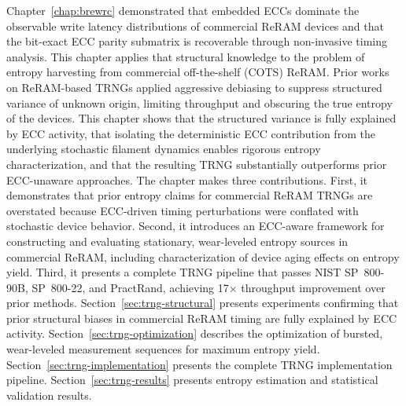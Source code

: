 \label{chap:trng}

Chapter~\ref{chap:brewrc} demonstrated that embedded ECCs dominate the
observable write latency distributions of commercial ReRAM devices and
that the bit-exact ECC parity submatrix is recoverable through
non-invasive timing analysis. This chapter applies that structural
knowledge to the problem of entropy harvesting from commercial
off-the-shelf (COTS) ReRAM. Prior works on ReRAM-based TRNGs applied
aggressive debiasing to suppress structured variance of unknown origin,
limiting throughput and obscuring the true entropy of the devices. This
chapter shows that the structured variance is fully explained by ECC
activity, that isolating the deterministic ECC contribution from the
underlying stochastic filament dynamics enables rigorous entropy
characterization, and that the resulting TRNG substantially outperforms
prior ECC-unaware approaches. The chapter makes three contributions.
First, it demonstrates that prior entropy claims for commercial ReRAM
TRNGs are overstated because ECC-driven timing perturbations were
conflated with stochastic device behavior. Second, it introduces an
ECC-aware framework for constructing and evaluating stationary,
wear-leveled entropy sources in commercial ReRAM, including
characterization of device aging effects on entropy yield. Third, it
presents a complete TRNG pipeline that passes NIST SP~800-90B,
SP~800-22, and PractRand, achieving 17$\times$ throughput improvement
over prior methods. Section~\ref{sec:trng-structural} presents
experiments confirming that prior structural biases in commercial ReRAM
timing are fully explained by ECC activity.
Section~\ref{sec:trng-optimization} describes the optimization of
bursted, wear-leveled measurement sequences for maximum entropy yield.
Section~\ref{sec:trng-implementation} presents the complete TRNG
implementation pipeline. Section~\ref{sec:trng-results} presents entropy
estimation and statistical validation results.
